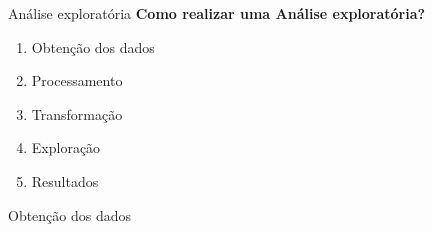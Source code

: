 \documentclass[pdf]
{beamer}
\begin{document}
\begin{frame}{Análise exploratória}
\textbf{\large Como realizar uma Análise exploratória?}
\vspace{0.2cm}
\begin{enumerate}
\item<2-> \alert<7>{Obtenção dos dados}
\item<3-> Processamento
\item<4-> Transformação
\item<5-> Exploração
\item<6-> Resultados
\end{enumerate}
\end{frame}

\begin{frame}{Obtenção dos dados}

\end{frame}
\end{document}
